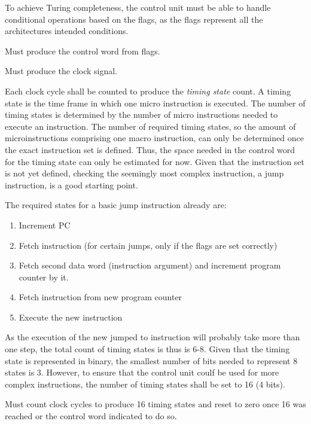To achieve Turing completeness, the control unit must be able to handle conditional operations based on the flags, as the flags represent all the architectures intended conditions.

\begin{turing-requirement}
  Must produce the control word from flags.
\end{turing-requirement}



\begin{arch-requirement}
  Must produce the clock signal. 
\end{arch-requirement}

Each clock cycle shall be counted to produce the \textit{timing state} count. A timing state is the time frame in which one micro instruction is executed. The number of timing states is determined by the number of micro instructions needed to execute an instruction. The number of required timing states, so the amount of microinstructions comprising one macro instruction, can only be determined once the exact instruction set is defined. Thus, the space needed in the control word for the timing state can only be estimated for now. Given that the instruction set is not yet defined, checking the seemingly most complex instruction, a jump instruction, is a good starting point. 

The required states for a basic jump instruction already are: 
\begin{enumerate}
  \item Increment PC
  \item Fetch instruction (for certain jumps, only if the flags are set correctly)
  \item Fetch second data word (instruction argument) and increment program counter by it.
  \item Fetch instruction from new program counter
  \item Execute the new instruction
\end{enumerate}
    
As the execution of the new jumped to instruction will probably take more than one step, the total count of timing states is thus is 6-8. Given that the timing state is represented in binary, the smallest number of bits needed to represent 8 states is 3. However, to ensure that the control unit coulf be used for more complex instructions, the number of timing states shall be set to 16 (4 bits).

\begin{arch-requirement}
  Must count clock cycles to produce 16 timing states and reset to zero once 16 was reached or the control word indicated to do so.
\end{arch-requirement}

